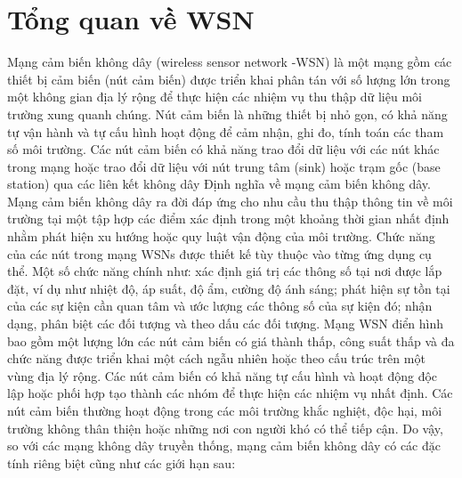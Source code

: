 \section{Tổng quan về WSN}
Mạng cảm biến không dây (wireless sensor network -WSN) là một mạng gồm các thiết bị cảm biến (nút cảm biến) được triển khai phân tán với số lượng lớn trong một không gian địa lý rộng để thực hiện các nhiệm vụ thu thập dữ liệu môi trường xung quanh chúng. Nút cảm biến là những thiết bị nhỏ gọn, có khả năng tự vận hành và tự cấu hình hoạt động để cảm nhận, ghi đo, tính toán các tham số môi trường. Các nút cảm biến có khả năng trao đổi dữ liệu với các nút khác trong mạng hoặc trao đổi dữ liệu với nút trung tâm (sink) hoặc trạm gốc (base station) qua các liên kết không dây Định nghĩa về mạng cảm biến không dây.
Mạng cảm biến không dây ra đời đáp ứng cho nhu cầu thu thập thông tin về môi trường tại một tập hợp các điểm xác định trong một khoảng thời gian nhất định nhằm phát hiện xu hướng hoặc quy luật vận động của môi trường. Chức năng của các nút trong mạng WSNs được thiết kế tùy thuộc vào từng ứng dụng cụ thể. Một số chức năng chính như: xác định giá trị các thông số tại nơi được lắp đặt, ví dụ như nhiệt độ, áp suất, độ ẩm, cường độ ánh sáng; phát hiện sự tồn tại của các sự kiện cần quan tâm và ước lượng các thông số của sự kiện đó; nhận dạng, phân biệt các đối tượng và theo dấu các đối tượng.	
Mạng WSN điển hình bao gồm một lượng lớn các nút cảm biến có giá thành thấp, công suất thấp và đa chức năng được triển khai một cách ngẫu nhiên hoặc theo cấu trúc trên một vùng địa lý rộng. Các nút cảm biến có khả năng tự cấu hình và hoạt động độc lập hoặc phối hợp tạo thành các nhóm để thực hiện các nhiệm vụ nhất định. Các nút cảm biến thường hoạt động trong các môi trường khắc nghiệt, độc hại, môi trường không thân thiện hoặc những nơi con người khó có thể tiếp cận. Do vậy, so với các mạng không dây truyền thống, mạng cảm biến không dây có các đặc tính riêng biệt cũng như các giới hạn sau:
